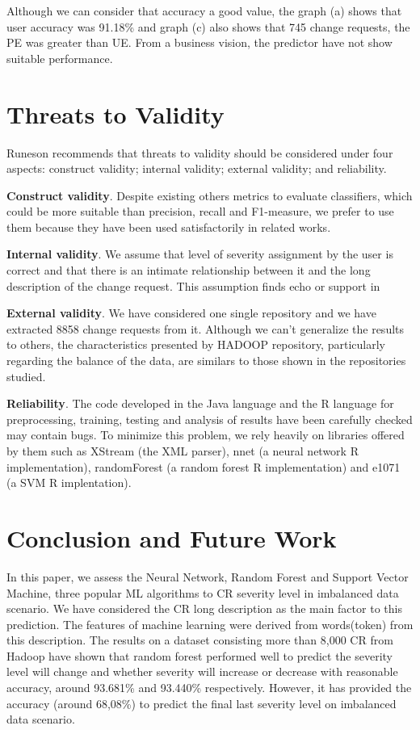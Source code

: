 \documentclass[10pt, conference]{IEEEtran}
\begin{document}
Although we can consider that accuracy a good value, the graph (a) shows that user accuracy was 91.18\% and graph (c) also shows that 745 change requests, the PE was greater than UE. From a business vision, the predictor have not show suitable performance.

\section{Threats to Validity}
Runeson \cite{Runeson2009} recommends that threats to validity should be considered under four aspects: construct validity;  internal validity; external validity; and reliability.

\textbf{Construct validity}. Despite existing others metrics to evaluate classifiers\cite{Facelli2015}, which could be more suitable than precision, recall and F1-measure, we prefer to use them because they have been used satisfactorily in related works\cite{Menzies2008, Lamkanfi2010, Lamkanfi2011, ValdiviaGarcia2014}.


\textbf{Internal validity}. We assume that level of severity assignment by the user is correct and that there is an intimate relationship between it and the long description of the change request. This assumption finds echo or support in \cite{Lamkanfi2010, Tian2012}

\textbf{External validity}. We have considered one single repository and we have extracted 8858 change requests from it. Although we can't generalize the results to others, the characteristics presented by HADOOP repository, particularly regarding the balance of the data, are similars to those shown in the repositories studied\cite{Lamkanfi2010, Lamkanfi2011, Tian2012,ValdiviaGarcia2014}.

\textbf{Reliability}. The code developed in the Java language and the R language for preprocessing, training, testing and analysis of results have been carefully checked may contain bugs. To minimize this problem, we rely heavily on libraries offered by them such as XStream (the XML parser), nnet (a neural network R implementation), randomForest (a random forest R implementation) and e1071 (a SVM R implentation). 

\section{Conclusion and Future Work}
In this paper, we assess the Neural Network, Random Forest and Support Vector Machine, three popular ML algorithms to CR severity level in imbalanced data scenario. We have considered the CR long description as the main factor to
this prediction. The features of machine learning were derived from
words(token) from this description. The results on a dataset consisting more than
8,000 CR from Hadoop have shown that random forest performed well to predict the severity level will change and whether severity will increase or decrease with reasonable accuracy, around 93.681\% and 93.440\% respectively. However, it has provided the accuracy (around 68,08\%) to predict the final last severity level on imbalanced data scenario.
\end{document}

